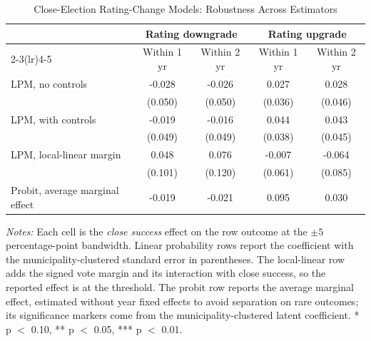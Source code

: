 \begin{table}[!htbp]
\centering
\caption{Close-Election Rating-Change Models: Robustness Across Estimators}
\label{tab:post_northeast_rdd_robustness}
\small
\begin{tabular}{lcccc}
\toprule
 & \multicolumn{2}{c}{Rating downgrade} & \multicolumn{2}{c}{Rating upgrade} \\
\cmidrule(lr){2-3}\cmidrule(lr){4-5}
 & Within 1 yr & Within 2 yr & Within 1 yr & Within 2 yr \\
\midrule
LPM, no controls & -0.028 & -0.026 & 0.027 & 0.028 \\
 & (0.050) & (0.050) & (0.036) & (0.046) \\
LPM, with controls & -0.019 & -0.016 & 0.044 & 0.043 \\
 & (0.049) & (0.049) & (0.038) & (0.045) \\
LPM, local-linear margin & 0.048 & 0.076 & -0.007 & -0.064 \\
 & (0.101) & (0.120) & (0.061) & (0.085) \\
\midrule
Probit, average marginal effect & -0.019 & -0.021 & 0.095 & 0.030 \\
\bottomrule
\end{tabular}
\vspace{0.05in}
\begin{minipage}{0.96\textwidth}\footnotesize\emph{Notes:} Each cell is the \emph{close success} effect on the row outcome at the $\pm 5$ percentage-point bandwidth. Linear probability rows report the coefficient with the municipality-clustered standard error in parentheses. The local-linear row adds the signed vote margin and its interaction with close success, so the reported effect is at the threshold. The probit row reports the average marginal effect, estimated without year fixed effects to avoid separation on rare outcomes; its significance markers come from the municipality-clustered latent coefficient. * p $<$ 0.10, ** p $<$ 0.05, *** p $<$ 0.01.\end{minipage}
\end{table}
